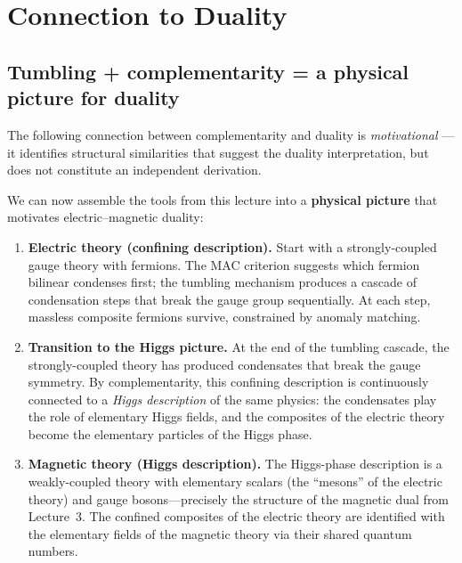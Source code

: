 \documentclass[11pt,a4paper]{article}
\begin{document}
\section{Connection to Duality}
\label{sec:connection}

\subsection{Tumbling + complementarity = a physical picture for duality}

The following connection between complementarity and duality is \emph{motivational} --- it identifies structural similarities that suggest the duality interpretation, but does not constitute an independent derivation.

We can now assemble the tools from this lecture into a \textbf{physical
picture} that motivates electric--magnetic duality:

\begin{enumerate}[label=\textbf{(\roman*)},leftmargin=*]
  \item \textbf{Electric theory (confining description).}  Start with
    a strongly-coupled gauge theory with fermions.  The MAC criterion
    suggests which fermion bilinear condenses first; the tumbling
    mechanism produces a cascade of condensation steps that break the
    gauge group sequentially.  At each step, massless composite
    fermions survive, constrained by anomaly matching.

  \item \textbf{Transition to the Higgs picture.}  At the end of the
    tumbling cascade, the strongly-coupled theory has produced
    condensates that break the gauge symmetry.  By complementarity,
    this confining description is continuously connected to a
    \emph{Higgs description} of the same physics: the condensates play
    the role of elementary Higgs fields, and the composites of the
    electric theory become the elementary particles of the Higgs phase.

  \item \textbf{Magnetic theory (Higgs description).}  The Higgs-phase
    description is a weakly-coupled theory with elementary scalars (the
    ``mesons'' of the electric theory) and gauge bosons---precisely the
    structure of the magnetic dual from Lecture~3.  The
    confined composites of the electric theory are identified with the
    elementary fields of the magnetic theory via their shared quantum
    numbers.
\end{enumerate}
\end{document}
